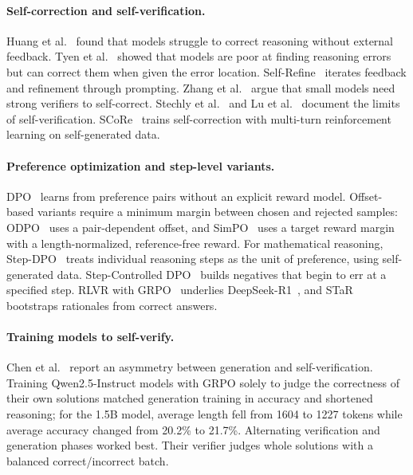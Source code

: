 \documentclass[11pt, a4paper]{article}
\begin{document}
\paragraph{Self-correction and self-verification.}
Huang et al.~\cite{huang2023large} found that models struggle to correct reasoning without external feedback. Tyen et al.~\cite{tyen2024llms} showed that models are poor at finding reasoning errors but can correct them when given the error location. Self-Refine~\cite{madaan2023selfrefine} iterates feedback and refinement through prompting. Zhang et al.~\cite{zhang2024small} argue that small models need strong verifiers to self-correct. Stechly et al.~\cite{stechly2025selfverification} and Lu et al.~\cite{lu2025verification} document the limits of self-verification. SCoRe~\cite{kumar2025score} trains self-correction with multi-turn reinforcement learning on self-generated data.

\paragraph{Preference optimization and step-level variants.}
DPO~\cite{rafailov2023direct} learns from preference pairs without an explicit reward model. Offset-based variants require a minimum margin between chosen and rejected samples: ODPO~\cite{amini2024odpo} uses a pair-dependent offset, and SimPO~\cite{meng2024simpo} uses a target reward margin with a length-normalized, reference-free reward. For mathematical reasoning, Step-DPO~\cite{lai2024stepdpo} treats individual reasoning steps as the unit of preference, using self-generated data. Step-Controlled DPO~\cite{lu2024scdpo} builds negatives that begin to err at a specified step. RLVR with GRPO~\cite{shao2024deepseekmath} underlies DeepSeek-R1~\cite{deepseek2025r1}, and STaR~\cite{zelikman2022star} bootstraps rationales from correct answers.

\paragraph{Training models to self-verify.}
Chen et al.~\cite{chen2026selfverify} report an asymmetry between generation and self-verification. Training Qwen2.5-Instruct models with GRPO solely to judge the correctness of their own solutions matched generation training in accuracy and shortened reasoning; for the 1.5B model, average length fell from 1604 to 1227 tokens while average accuracy changed from 20.2\% to 21.7\%. Alternating verification and generation phases worked best. Their verifier judges whole solutions with a balanced correct/incorrect batch.
\end{document}
